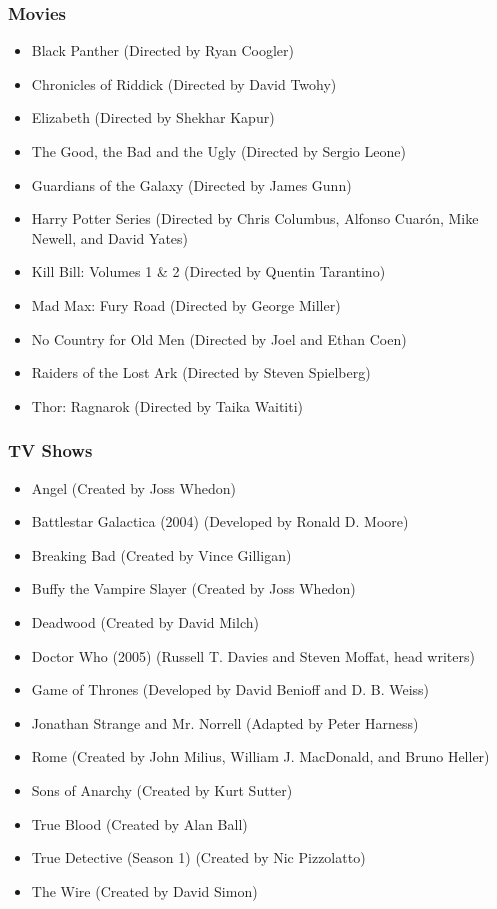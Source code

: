 \documentclass[10pt,a4paper,twoside,bg=print,twocolumn,openany,nodeprecatedcode]{dndbook}
\begin{document}
\subsubsection{Movies}

\begin{itemize}
\item Black Panther (Directed by Ryan Coogler)
\item Chronicles of Riddick (Directed by David Twohy)
\item Elizabeth (Directed by Shekhar Kapur)
\item The Good, the Bad and the Ugly (Directed by Sergio Leone)
\item Guardians of the Galaxy (Directed by James Gunn)
\item Harry Potter Series (Directed by Chris Columbus, Alfonso Cuarón, Mike Newell, and David Yates)
\item Kill Bill: Volumes 1 \& 2 (Directed by Quentin Tarantino)
\item Mad Max: Fury Road (Directed by George Miller)
\item No Country for Old Men (Directed by Joel and Ethan Coen)
\item Raiders of the Lost Ark (Directed by Steven Spielberg)
\item Thor: Ragnarok (Directed by Taika Waititi)
\end{itemize}

\subsubsection{TV Shows}

\begin{itemize}
\item Angel (Created by Joss Whedon)
\item Battlestar Galactica (2004) (Developed by Ronald D. Moore)
\item Breaking Bad (Created by Vince Gilligan)
\item Buffy the Vampire Slayer (Created by Joss Whedon)
\item Deadwood (Created by David Milch)
\item Doctor Who (2005) (Russell T. Davies and Steven Moffat, head writers)
\item Game of Thrones (Developed by David Benioff and D. B. Weiss)
\item Jonathan Strange and Mr. Norrell (Adapted by Peter Harness)
\item Rome (Created by John Milius, William J. MacDonald, and Bruno Heller)
\item Sons of Anarchy (Created by Kurt Sutter)
\item True Blood (Created by Alan Ball)
\item True Detective (Season 1) (Created by Nic Pizzolatto)
\item The Wire (Created by David Simon)
\end{itemize}
\end{document}
